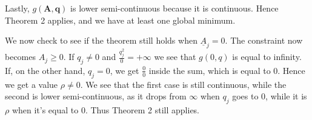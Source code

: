 Lastly, $g(\bm{A},\bm{q})$ is lower semi-continuous because it is continuous. Hence Theorem 2 applies, and we have at least one global minimum.

We now check to see if the theorem still holds when $\underline{A}_{j} = 0$. The constraint now becomes $A_{j} \geq 0$. If $q_{j} \neq 0$ and $\frac{q_{j}^2}{0} = +\infty$ we see that $g(0,q)$ is equal to infinity. If, on the other hand, $q_{j} = 0$, we get $\frac{0}{0}$ inside the sum, which is equal to 0. Hence we get a value $\rho \neq 0$. We see that the first case is still continuous, while the second is lower semi-continuous, as it drops from $\infty$ when $q_{j}$ goes to 0, while it is $\rho$ when it's equal to 0. Thus Theorem 2 still applies.




